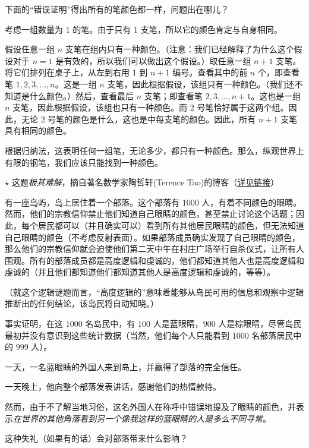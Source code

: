 \clearpage

\begin{exercise}
    下面的``错误证明''得出所有的笔颜色都一样，问题出在哪儿？
    \begin{spoof}
        考虑一组数量为 $1$ 的笔。由于只有 $1$ 支笔，所以它的颜色肯定与自身相同。

        假设任意一组 $n$ 支笔在组内只有一种颜色。（注意：我们已经解释了为什么这个假设对于 $n = 1$ 是有效的，所以我们可以做出这个假设。）取任意一组 $n + 1$ 支笔。将它们排列在桌子上，从左到右用 $1$ 到 $n + 1$ 编号。查看其中的前 $n$ 个，即查看笔 $1,2,3, \dots , n$。这是一组 $n$ 支笔，因此根据假设，该组只有一种颜色。（我们还不知道是什么颜色。）然后，查看最后 $n$ 支笔；即查看笔 $2,3, \dots ,n+1$。这也是一组 $n$ 支笔，因此根据假设，该组也只有一种颜色。而 $2$ 号笔恰好属于这两个组。因此，无论 $2$ 号笔的颜色是什么，这也是中每支笔的颜色。因此，所有 $n+1$ 支笔具有相同的颜色。

        根据归纳法，这表明任何一组笔，无论多少，都只有一种颜色。那么，纵观世界上有限的钢笔，我们应该只能找到一种颜色。
    \end{spoof}
\end{exercise}

\begin{exercise}
    $\star$ 这题\emph{极其难解}，摘自著名数学家陶哲轩(Terence Tao)的博客（\href{https://terrytao.wordpress.com/2011/04/07/the-blue-eyed-islanders-puzzle-repost/}{详见链接}）

    有一座岛屿，岛上居住着一个部落。这个部落有 $1000$ 人，有着不同颜色的眼睛。然而，他们的宗教信仰禁止他们知道自己眼睛的颜色，甚至禁止讨论这个话题；因此，每个居民都可以（并且确实可以）看到所有其他居民眼睛的颜色，但无法知道自己眼睛的颜色（不考虑反射表面）。如果部落成员确实发现了自己眼睛的颜色，那么他们的宗教信仰就会迫使他们第二天中午在村庄广场举行自杀仪式，让所有人围观。所有的部落成员都是高度逻辑和虔诚的，他们都知道其他人也是高度逻辑和虔诚的（并且他们都知道他们都知道其他人是高度逻辑和虔诚的，等等）。

    （就这个逻辑谜题而言，``高度逻辑的''意味着能够从岛民可用的信息和观察中逻辑推断出的任何结论，该岛民将自动知晓。）

    事实证明，在这 $1000$ 名岛民中，有 $100$ 人是蓝眼睛，$900$ 人是棕眼睛，尽管岛民最初并没有意识到这些统计数据（当然，他们每个人只能看到 $1000$ 名部落居民中的 $999$ 人）。

    一天，一名蓝眼睛的外国人来到岛上，并赢得了部落的完全信任。

    一天晚上，他向整个部落发表讲话，感谢他们的热情款待。

    然而，由于不了解当地习俗，这名外国人在称呼中错误地提及了眼睛的颜色，并表示\emph{在世界的其他角落看到另一个像我这样的蓝眼睛的人是多么不同寻常}。

    这种失礼（如果有的话）会对部落带来什么影响？
\end{exercise}